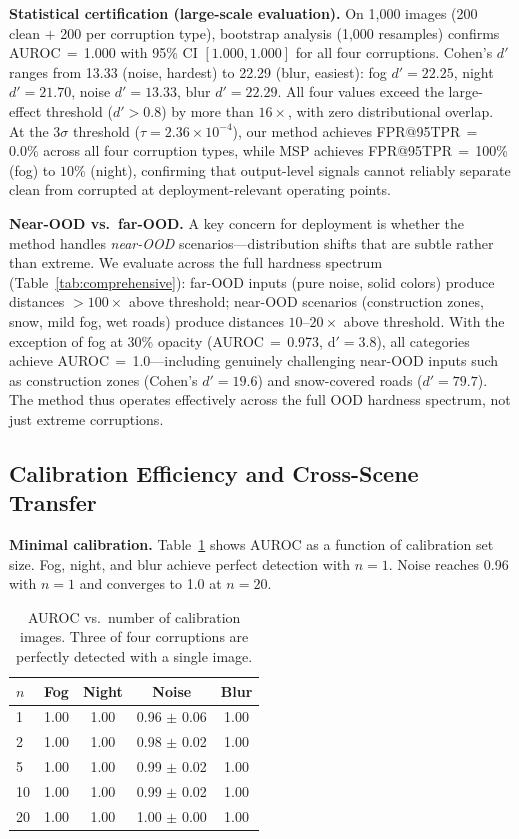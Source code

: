 \documentclass[11pt]{article}
\begin{document}
\textbf{Statistical certification (large-scale evaluation).}
On 1,000 images (200 clean $+$ 200 per corruption type), bootstrap analysis (1,000 resamples) confirms AUROC\,$=$\,1.000 with 95\% CI $[1.000, 1.000]$ for all four corruptions.
Cohen's $d'$ ranges from 13.33 (noise, hardest) to 22.29 (blur, easiest): fog $d'= 22.25$, night $d' = 21.70$, noise $d' = 13.33$, blur $d' = 22.29$.
All four values exceed the large-effect threshold ($d' > 0.8$) by more than $16\times$, with zero distributional overlap.
At the $3\sigma$ threshold ($\tau = 2.36 \times 10^{-4}$), our method achieves FPR@95TPR\,$=$\,0.0\% across all four corruption types, while MSP achieves FPR@95TPR\,$=$\,100\% (fog) to $10$\% (night), confirming that output-level signals cannot reliably separate clean from corrupted at deployment-relevant operating points.

\textbf{Near-OOD vs.\ far-OOD.}
A key concern for deployment is whether the method handles \emph{near-OOD} scenarios---distribution shifts that are subtle rather than extreme.
We evaluate across the full hardness spectrum (Table~\ref{tab:comprehensive}): far-OOD inputs (pure noise, solid colors) produce distances $>$$100\times$ above threshold; near-OOD scenarios (construction zones, snow, mild fog, wet roads) produce distances $10$--$20\times$ above threshold.
With the exception of fog at 30\% opacity (AUROC\,$=$\,0.973, d$' = 3.8$), all categories achieve AUROC\,$=$\,1.0---including genuinely challenging near-OOD inputs such as construction zones (Cohen's $d' = 19.6$) and snow-covered roads ($d' = 79.7$).
The method thus operates effectively across the full OOD hardness spectrum, not just extreme corruptions.

\subsection{Calibration Efficiency and Cross-Scene Transfer}
\label{sec:transfer}

\textbf{Minimal calibration.}
Table~\ref{tab:calibration_size} shows AUROC as a function of calibration set size.
Fog, night, and blur achieve perfect detection with $n = 1$.
Noise reaches 0.96 with $n = 1$ and converges to 1.0 at $n = 20$.

\begin{table}[t]
\centering
\caption{AUROC vs.\ number of calibration images. Three of four corruptions are perfectly detected with a single image.}
\label{tab:calibration_size}
\small
\begin{tabular}{lcccc}
\toprule
$n$ & \textbf{Fog} & \textbf{Night} & \textbf{Noise} & \textbf{Blur} \\
\midrule
1 & 1.00 & 1.00 & 0.96 $\pm$ 0.06 & 1.00 \\
2 & 1.00 & 1.00 & 0.98 $\pm$ 0.02 & 1.00 \\
5 & 1.00 & 1.00 & 0.99 $\pm$ 0.02 & 1.00 \\
10 & 1.00 & 1.00 & 0.99 $\pm$ 0.02 & 1.00 \\
20 & 1.00 & 1.00 & 1.00 $\pm$ 0.00 & 1.00 \\
\bottomrule
\end{tabular}
\end{table}
\end{document}
